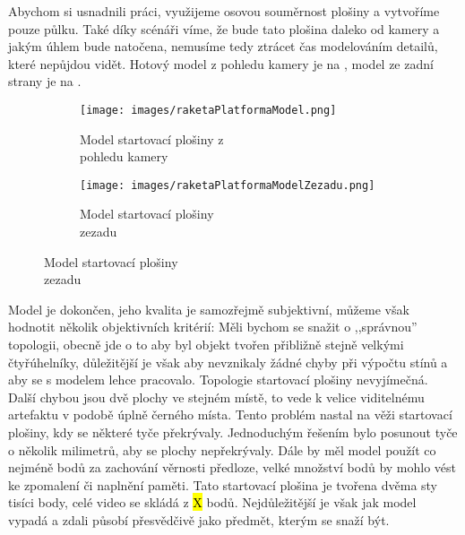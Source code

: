 {\newpage

{Abychom si usnadnili práci, využijeme osovou souměrnost plošiny a vytvoříme pouze půlku. Také díky scénáři víme, že bude tato plošina daleko od kamery a jakým úhlem bude natočena, nemusíme tedy ztrácet čas modelováním detailů, které nepůjdou vidět. Hotový model z pohledu kamery je na , model ze zadní strany je na .}

\begin{figure}[H]
    \centering

    \begingroup
    \makeatletter
    \renewcommand\thesubfigure{\thefigure~--~\@nameuse{subfiglabel@\alph{subfigure}}}
    \newcommand{\subfiglabel@a}{vlevo}
    \newcommand{\subfiglabel@b}{vpravo}
    \captionsetup[subfigure]{labelformat=simple, labelsep=colon}
    \renewcommand\p@subfigure{}
    \makeatother

    \begin{subfigure}{.48\textwidth}
        \centering
        \texttt{[image: images/raketaPlatformaModel.png]}
        \caption{Model startovací plošiny z \\pohledu kamery \jaObr}
        \label{obr:plosinaModel}
    \end{subfigure}
    \hfill
    \begin{subfigure}{.48\textwidth}
        \centering
        \texttt{[image: images/raketaPlatformaModelZezadu.png]}
        \caption{Model startovací plošiny \\zezadu \jaObr}
        \label{obr:plosinaModelZezadu}
    \end{subfigure}

    \endgroup

\end{figure}

{Model je dokončen, jeho kvalita je samozřejmě subjektivní, můžeme však hodnotit několik objektivních kritérií:}\odst 
{Měli bychom se snažit o ,,správnou'' topologii, obecně jde o to aby byl objekt tvořen přibližně stejně velkými čtyřúhelníky, důležitější je však aby nevznikaly žádné chyby při výpočtu stínů a aby se s modelem lehce pracovalo. Topologie startovací plošiny nevyjímečná.}\odst
{Další chybou jsou dvě plochy ve stejném místě, to vede k velice viditelnému artefaktu v podobě úplně černého místa. Tento problém nastal na věži startovací plošiny, kdy se některé tyče překrývaly. Jednoduchým řešením bylo posunout tyče o několik milimetrů, aby se plochy nepřekrývaly.}\odst
{Dále by měl model použít co nejméně bodů za zachování věrnosti předloze, velké množství bodů by mohlo vést ke zpomalení či naplnění paměti. Tato startovací plošina je tvořena dvěma sty tisíci body, celé video se skládá z \hl{X} bodů.}\odst
{Nejdůležitější je však jak model vypadá a zdali působí přesvědčivě jako předmět, kterým se snaží být.}

}
